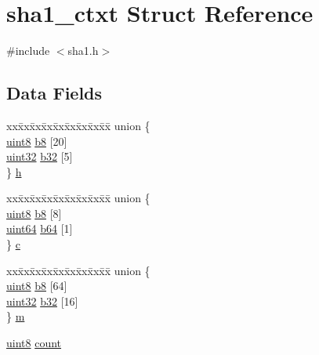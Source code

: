 \hypertarget{structsha1__ctxt}{\section{sha1\-\_\-ctxt Struct Reference}
\label{structsha1__ctxt}
}


{\ttfamily \#include $<$sha1.\-h$>$}

\subsection*{Data Fields}
\begin{DoxyCompactItemize}
\item 
\begin{tabbing}
xx\=xx\=xx\=xx\=xx\=xx\=xx\=xx\=xx\=\kill
union \{\\
\>\hyperlink{c_8h_adde6aaee8457bee49c2a92621fe22b79}{uint8} \hyperlink{structsha1__ctxt_a20ea01a601650ffe78b44fb952a0cbd7}{b8} \mbox{[}20\mbox{]}\\
\>\hyperlink{c_8h_a1134b580f8da4de94ca6b1de4d37975e}{uint32} \hyperlink{structsha1__ctxt_a3f9898b833367479e782d6d6cb1bb0fb}{b32} \mbox{[}5\mbox{]}\\
\} \hyperlink{structsha1__ctxt_a478ab16257190d0cfd8bbede1eeeda7c}{h}\\

\end{tabbing}\item 
\begin{tabbing}
xx\=xx\=xx\=xx\=xx\=xx\=xx\=xx\=xx\=\kill
union \{\\
\>\hyperlink{c_8h_adde6aaee8457bee49c2a92621fe22b79}{uint8} \hyperlink{structsha1__ctxt_a20ea01a601650ffe78b44fb952a0cbd7}{b8} \mbox{[}8\mbox{]}\\
\>\hyperlink{c_8h_af68cb4c1926b997d49286c1e0c7fa68a}{uint64} \hyperlink{structsha1__ctxt_ad71b7aed3ab559ee5b941aceab39dc28}{b64} \mbox{[}1\mbox{]}\\
\} \hyperlink{structsha1__ctxt_a3253de2ebd252fb00696e3d482fec162}{c}\\

\end{tabbing}\item 
\begin{tabbing}
xx\=xx\=xx\=xx\=xx\=xx\=xx\=xx\=xx\=\kill
union \{\\
\>\hyperlink{c_8h_adde6aaee8457bee49c2a92621fe22b79}{uint8} \hyperlink{structsha1__ctxt_a20ea01a601650ffe78b44fb952a0cbd7}{b8} \mbox{[}64\mbox{]}\\
\>\hyperlink{c_8h_a1134b580f8da4de94ca6b1de4d37975e}{uint32} \hyperlink{structsha1__ctxt_a3f9898b833367479e782d6d6cb1bb0fb}{b32} \mbox{[}16\mbox{]}\\
\} \hyperlink{structsha1__ctxt_a93549e237a32b4138b686c258a24e931}{m}\\

\end{tabbing}\item 
\hyperlink{c_8h_adde6aaee8457bee49c2a92621fe22b79}{uint8} \hyperlink{structsha1__ctxt_aa30918035917fa1f893b77aeb4737dad}{count}
\end{DoxyCompactItemize}


